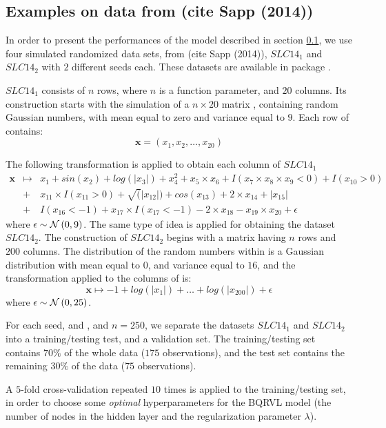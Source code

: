 \newpage

\subsection{Examples on data from (cite Sapp (2014))}
\label{sec:sapp2014}

In order to present the performances of the model described in section \ref{sec:sapp2014}, we use four simulated randomized data sets, from (cite Sapp (2014)), $SLC14_1$ and $SLC14_2$ with $2$ different seeds each. These datasets are available in  package . 

$SLC14_1$ consists of $n$ rows, where $n$ is a function parameter, and $20$ columns. Its construction starts with the simulation of a $n \times 20$ matrix , containing random Gaussian numbers, with mean equal to zero and variance equal to $9$. Each row of  contains: 
$$
\textbf{x} = \left( x_1, x_2, \ldots, x_{20}\right) 
$$

The following transformation is applied to obtain each column of $SLC14_1$
\begin{eqnarray*}
 \textbf{x} &\mapsto& x_1 + sin(x_2) + log(|x_3|) + x_4^2 + x_5 \times x_6 +
I(x_7 \times x_8 \times x_9 < 0) + I(x_{10} > 0) \\
&+& x_{11} \times I(x_{11} > 0) + \sqrt(|x_{12}|) +
cos(x_{13}) + 2 \times x_{14} + |x_{15}| \\ 
&+& I(x_{16} < -1) + x_{17} \times I(x_{17} < -1) - 2  \times  x_{18}
- x_{19} \times x_{20} + \epsilon
\end{eqnarray*}
where $\epsilon \sim \mathcal{N}\left(0, 9\right)$. The same type of idea is applied for obtaining the dataset $SLC14_2$. The construction of $SLC14_2$ begins with a matrix  having $n$ rows and $200$ columns. The distribution of the random numbers within  is a Gaussian distribution with mean equal to $0$, and variance equal to $16$, and the transformation applied to the columns of  is: 
$$
\textbf{x} \mapsto -1 + log(|x_1|) + \ldots + log(|x_{200}|)  + \epsilon
$$
where $\epsilon \sim \mathcal{N}\left(0, 25\right)$.

For each seed,  and , and $n = 250$, we separate the datasets $SLC14_1$ and $SLC14_2$ into a training/testing test, and a validation set. The training/testing set contains $70\%$ of the whole data ($175$ observations), and the test set contains the remaining $30\%$ of the data ($75$ observations). 

A $5$-fold cross-validation repeated $10$ times is applied to the training/testing set, in order to choose some \textit{optimal} hyperparameters for the BQRVL model (the number of nodes in the hidden layer and the regularization parameter $\lambda$). 

